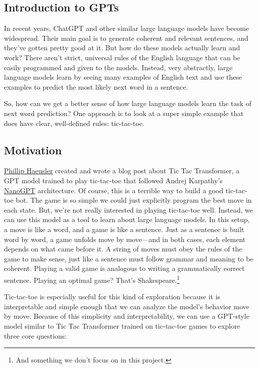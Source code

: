\documentclass[11pt]{article}
\begin{document}
\subsection{Introduction to GPTs}\label{introduction-to-gpts}

In recent years, ChatGPT and other similar large language models have
become widespread. Their main goal is to generate coherent and relevant
sentences, and they've gotten pretty good at it. But how do these models
actually learn and work? There aren't strict, universal rules of the
English language that can be easily programmed and given to the models.
Instead, very abstractly, large language models learn by seeing many
examples of English text and use these examples to predict the most
likely next word in a sentence.

So, how can we get a better sense of how large language models learn the
task of next word prediction? One approach is to look at a super simple
example that does have clear, well-defined rules: tic-tac-toe.

\subsection{Motivation}\label{motivation}

\href{https://philliphaeusler.com/posts/tic_tac_toe/}{Phillip Haeusler}
created and wrote a blog post about Tic Tac Transformer, a GPT model
trained to play tic-tac-toe that followed Andrej Karpathy's
\href{https://www.youtube.com/watch?v=kCc8FmEb1nY}{NanoGPT}
architecture. Of course, this is a terrible way to build a good
tic-tac-toe bot. The game is so simple we could just explicitly program
the best move in each state. But, we're not really interested in playing
tic-tac-toe well. Instead, we can use this model as a tool to learn
about large language models. In this setup, a move is like a word, and a
game is like a sentence. Just as a sentence is built word by word, a
game unfolds move by move---and in both cases, each element depends on
what came before it. A string of moves must obey the rules of the game
to make sense, just like a sentence must follow grammar and meaning to
be coherent. Playing a valid game is analogous to writing a
grammatically correct sentence. Playing an optimal game? That's
Shakespeare.\footnote{And something we don't focus on in this project.}

Tic-tac-toe is especially useful for this kind of exploration because it
is interpretable and simple enough that we can analyze the model's
behavior move by move. Because of this simplicity and interpretability,
we can use a GPT-style model similar to Tic Tac Transformer trained on
tic-tac-toe games to explore three core questions:
\end{document}
